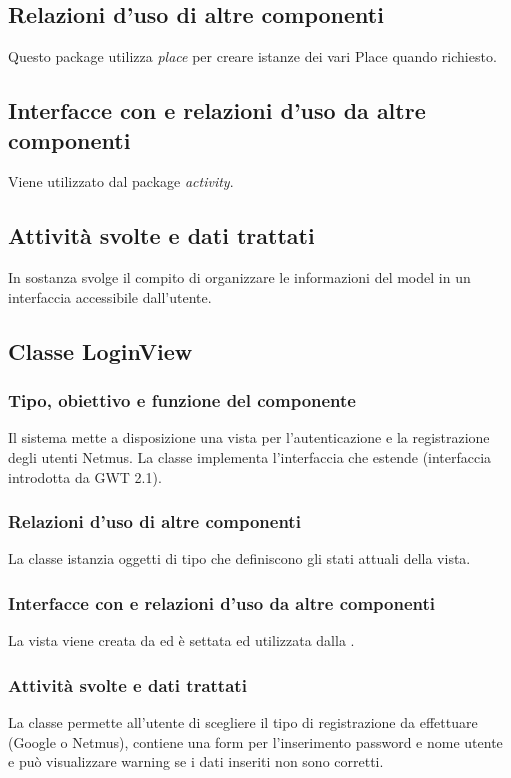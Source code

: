 \subsection*{Relazioni d'uso di altre componenti}
Questo package utilizza \emph{place} per creare istanze dei vari Place quando
richiesto.

\subsection*{Interfacce con e relazioni d'uso da altre componenti}
Viene utilizzato dal package \emph{activity}.

\subsection*{Attivit\`a svolte e dati trattati}
In sostanza svolge il compito di organizzare le informazioni del model in un
interfaccia accessibile dall'utente.

\subsection{Classe LoginView}
\subsubsection*{Tipo, obiettivo e funzione del componente}
Il sistema mette a disposizione una vista per l'autenticazione e la
registrazione degli utenti Netmus. La classe 
implementa l'interfaccia  che estende 
(interfaccia introdotta da GWT 2.1).
\subsubsection*{Relazioni d'uso di altre componenti}
La classe istanzia oggetti di tipo  che definiscono gli stati
attuali della vista.
\subsubsection*{Interfacce con e relazioni d'uso da altre componenti}
La vista viene creata da  ed \`e settata ed utilizzata dalla
.
\subsubsection*{Attivit\`a svolte e dati trattati}
La classe permette all'utente di scegliere il tipo di registrazione da
effettuare (Google o Netmus), contiene una form per l'inserimento password e
nome utente e pu\`o visualizzare warning se i dati inseriti non sono corretti.

